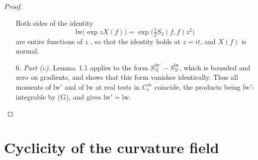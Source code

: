 \documentclass[11pt,letterpaper,reqno]{amsart}
\theoremstyle{definition}
\begin{document}
\begin{proof}
\begin{enumerate}
Both sides of the identity
\begin{equation*}
\mathrm{lw}\bigl(\exp zX(f)\bigr)=\exp\bigl(\tfrac12S_2(f,f)z^2\bigr)
\end{equation*}
are entire functions of $z$ \cite[Proposition~5.1 and Section~5.2]{QEDConstruction}, so that the identity holds at $z=it$, and $X(f)$ is normal.
\item[6.] \emph{Part (c).}
Lemma~1.1 applies to the form $S_N^{\mathrm{lw}'}-S_N^{\mathrm{lw}}$, which is bounded \cite[Proposition~5.1]{QEDConstruction} and zero on gradients, and shows that this form vanishes identically.
Thus all moments of $\mathrm{lw}'$ and of $\mathrm{lw}$ at real tests in $C_c^\infty$ coincide, the products being $\mathrm{lw}'$-integrable by (G), and \cite[Proposition~5.1 and Section~5.2]{QEDConstruction} gives $\mathrm{lw}'=\mathrm{lw}$.
\end{enumerate}
\end{proof}


\section{Cyclicity of the curvature field}
\end{document}
